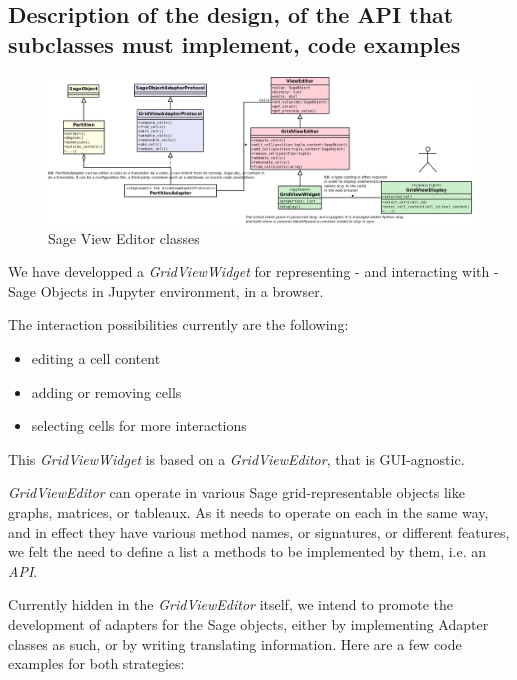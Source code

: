 \documentclass{deliverablereport}
\begin{document}
\subsection{Description of the design, of the API that subclasses must
  implement, code examples}

\begin{figure}[h]
  \begin{center}
    \includegraphics[width=\textwidth]{schemas/SageViewEditor}
  \end{center}
  \caption{Sage View Editor classes}
  \label{fig:lmfdb}
\end{figure}

We have developped a \emph{GridViewWidget} for representing - and
interacting with - Sage Objects in Jupyter environment, in a browser.

The interaction possibilities currently are the following:
\begin{itemize}
  \item editing a cell content
  \item adding or removing cells
  \item selecting cells for more interactions
\end{itemize}

This \emph{GridViewWidget} is based on a \emph{GridViewEditor}, that
is GUI-agnostic.

\emph{GridViewEditor} can operate in various Sage grid-representable objects like graphs,
matrices, or tableaux. As it needs to operate on each in the same way,
and in effect they have various method names, or signatures, or
different features, we felt the need to define a list a methods to be
implemented by them, i.e. an \emph{API}.

Currently hidden in the \emph{GridViewEditor} itself, we intend to promote
the development of adapters for the Sage objects, either by implementing Adapter
classes as such, or by writing translating information. Here are a few code examples
for both strategies:
\end{document}

